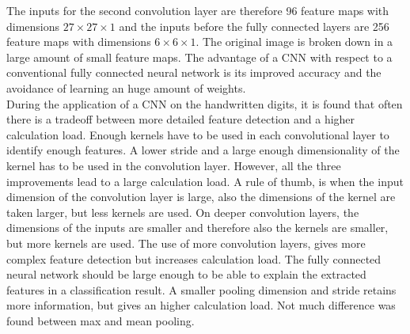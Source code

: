 \documentclass[a4paper,10pt]{article}
\begin{document}
The inputs for the second convolution layer are therefore 96 feature maps with dimensions $ 27 \times 27 \times 1$ and the inputs before the fully connected layers are 256 feature maps with dimensions $ 6 \times 6 \times 1$. The original image is broken down in a large amount of small feature maps. The advantage of a CNN with respect to a conventional fully connected neural network is its improved accuracy and the avoidance of learning an huge amount of weights.\\

During the application of a CNN on the handwritten digits, it is found that often there is a tradeoff between more detailed feature detection and a higher calculation load. Enough kernels have to be used in each convolutional layer to identify enough features. A lower stride and a large enough dimensionality of the kernel has to be used in the convolution layer. However, all the three improvements lead to a large calculation load. A rule of thumb, is when the input dimension of the convolution layer is large, also the dimensions of the kernel are taken larger, but less  kernels are used. On deeper convolution layers, the dimensions of the inputs are smaller and therefore also the kernels are smaller, but more kernels are used. The use of more convolution layers, gives more complex feature detection but increases calculation load. The fully connected neural network should be large enough to be able to explain the extracted features in a classification result. A smaller pooling dimension and stride retains more information, but gives an higher calculation load. Not much difference was found between max and mean pooling.


%
%
%
%
%
\end{document}
